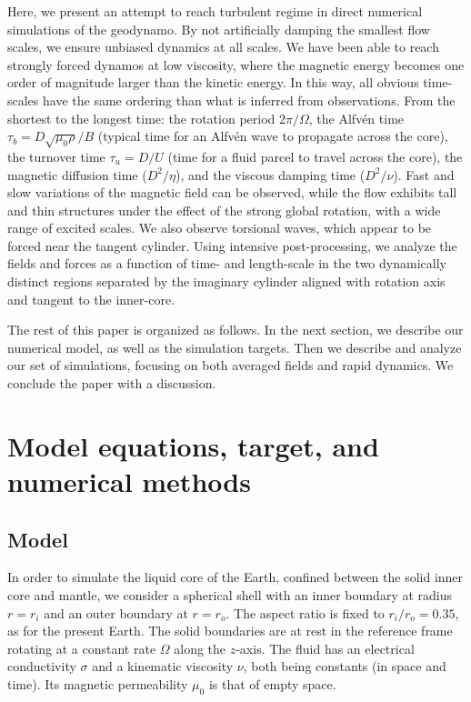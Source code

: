 \documentclass[12pt, a4paper]{article}
\begin{document}
Here, we present an attempt to reach turbulent regime in direct numerical simulations of the geodynamo.
By not artificially damping the smallest flow scales, we ensure unbiased dynamics at all scales.
We have been able to reach strongly forced dynamos at low viscosity, where the magnetic energy becomes one order of magnitude larger than the kinetic energy.
In this way, all obvious time-scales have the same ordering than what is inferred from observations.
From the shortest to the longest time: the rotation period $2\pi/\Omega$, the Alfvén time $\tau_b=D\sqrt{\mu_0\rho}/B$ (typical time for an Alfvén wave to propagate across the core), the turnover time $\tau_u=D/U$ (time for a fluid parcel to travel across the core), the magnetic diffusion time ($D^2/\eta$), and the viscous damping time ($D^2/\nu$).
Fast and slow variations of the magnetic field can be observed, while the flow exhibits tall and thin structures under the effect of the strong global rotation, with a wide range of excited scales.
We also observe torsional waves, which appear to be forced near the tangent cylinder.
Using intensive post-processing, we analyze the fields and forces as a function of time- and length-scale in the two dynamically distinct regions separated by the imaginary cylinder aligned with rotation axis and tangent to the inner-core.

The rest of this paper is organized as follows.
In the next section, we describe our numerical model, as well as the simulation targets.
Then we describe and analyze our set of simulations, focusing on both averaged fields and rapid dynamics.
We conclude the paper with a discussion.


\section{Model equations, target, and numerical methods}

\subsection{Model} \label{sec:model}

In order to simulate the liquid core of the Earth, confined between the solid inner core and mantle, we consider a spherical shell with an inner boundary at radius $r=r_i$ and an outer boundary at $r=r_o$.
The aspect ratio is fixed to $r_i/r_o = 0.35$, as for the present Earth.
The solid boundaries are at rest in the reference frame rotating at a constant rate $\Omega$ along the $z$-axis.
The fluid has an electrical conductivity $\sigma$ and a kinematic viscosity $\nu$, both being constants (in space and time).
Its magnetic permeability $\mu_0$ is that of empty space.
\end{document}
